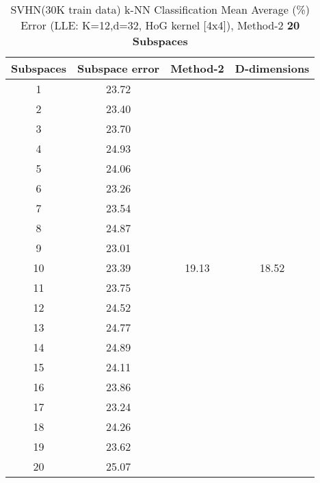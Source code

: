 \begin{table}[H]
\centering
\label{tab:table18}
\begin{tabular}{|c|c|c|c|}
\hline
\textlatin{Subspaces} & \textlatin{Subspace error} & \textlatin{Method-2} & \textlatin{D-dimensions}  \\
\hline
1 & 23.72 & & \\
2 & 23.40 & & \\
3 & 23.70 & & \\
4 & 24.93 & & \\
5 & 24.06 & & \\
6 & 23.26 & & \\
7 & 23.54 &  & \\
8 & 24.87 & & \\
9 & 23.01 &  & \\
10 & 23.39 & 19.13 & 18.52 \\
11 & 23.75 & & \\
12 & 24.52 &  & \\
13 & 24.77 &  & \\
14 & 24.89 & & \\
15 & 24.11 & & \\
16 & 23.86 & & \\
17 & 23.24 &  & \\
18 & 24.26 & & \\
19 & 23.62 &  & \\
20 & 25.07 &  & \\
\hline
\end{tabular}
\caption{\textlatin{SVHN(30K train data) k-NN Classification Mean Average (\%) Error (LLE: K=12,d=32, HoG kernel [4x4]), Method-2 \textbf{20 Subspaces}}}
\end{table}

